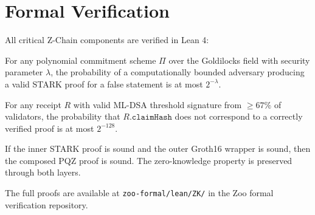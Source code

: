 \section{Formal Verification}


All critical Z-Chain components are verified in Lean 4:

\begin{theorem}
For any polynomial commitment scheme $\Pi$ over the Goldilocks field with security parameter $\lambda$, the probability of a computationally bounded adversary producing a valid STARK proof for a false statement is at most $2^{-\lambda}$.
\end{theorem}

\begin{theorem}
For any receipt $R$ with valid ML-DSA threshold signature from $\geq 67\%$ of validators, the probability that $R.\texttt{claimHash}$ does not correspond to a correctly verified proof is at most $2^{-128}$.
\end{theorem}

\begin{theorem}
If the inner STARK proof is sound and the outer Groth16 wrapper is sound, then the composed PQZ proof is sound. The zero-knowledge property is preserved through both layers.
\end{theorem}

The full proofs are available at \texttt{zoo-formal/lean/ZK/} in the Zoo formal verification repository.

